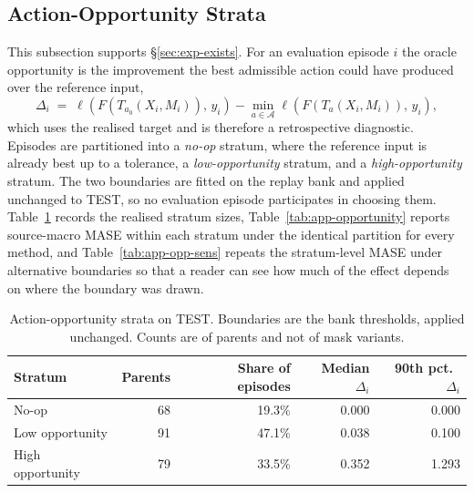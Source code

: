 \documentclass{article}
\newcommand{\calA}{\mathcal{A}}
\newcommand{\loss}{\ell}
\begin{document}
\subsection{Action-Opportunity Strata}
\label{app:opportunity}
This subsection supports \S\ref{sec:exp-exists}. For an evaluation episode $i$ the oracle
opportunity is the improvement the best admissible action could have produced over the
reference input,
\begin{equation}
  \Delta_i \;=\; \loss\!\left(F(T_{a_0}(X_i, M_i)),\, y_i\right) - \min_{a \in \calA} \loss\!\left(F(T_{a}(X_i, M_i)),\, y_i\right),
  \label{eq:opportunity}
\end{equation}
which uses the realised target and is therefore a retrospective diagnostic. Episodes are partitioned into a \emph{no-op} stratum, where the reference input is
already best up to a tolerance, a \emph{low-opportunity} stratum, and a
\emph{high-opportunity} stratum. The two boundaries are fitted on the replay bank and applied
unchanged to TEST, so no evaluation episode participates in choosing them.
Table~\ref{tab:app-opp-sizes} records the realised stratum sizes,
Table~\ref{tab:app-opportunity} reports source-macro MASE within each stratum under the
identical partition for every method, and Table~\ref{tab:app-opp-sens} repeats the
stratum-level MASE under alternative boundaries so that a reader can see how much of the
effect depends on where the boundary was drawn.

\begin{table}[htbp]
  \caption{Action-opportunity strata on TEST. Boundaries are the bank thresholds, applied
  unchanged. Counts are of parents and not of mask variants.}
  \label{tab:app-opp-sizes}
  \centering
  \small
  \setlength{\tabcolsep}{4pt}
\begin{tabular*}{\textwidth}{@{\extracolsep{\fill}}lrrrr@{}}
    \toprule
    Stratum & Parents & Share of episodes & Median $\Delta_i$ & 90th pct.\ $\Delta_i$ \\
    \midrule
    No-op             & 68  & 19.3\%  & 0.000  & 0.000 \\
    Low opportunity   & 91   & 47.1\%   & 0.038   & 0.100 \\
    High opportunity  & 79  & 33.5\%  & 0.352  & 1.293 \\
    \bottomrule
  \end{tabular*}
\end{table}
\end{document}
